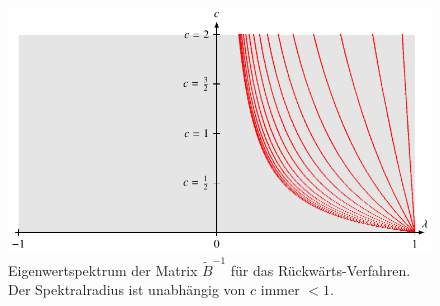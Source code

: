 \begin{figure}
\centering
\includegraphics{chapters/70-pde/images/implizitspektrum.pdf}
\caption{Eigenwertspektrum der Matrix $\tilde{B}^{-1}$ für das 
Rückwärts-Verfahren.
Der Spektralradius ist unabhängig von $c$ immer $<1$.
\label{buch:pde:waerme:implizitspektrum}}
\end{figure}


